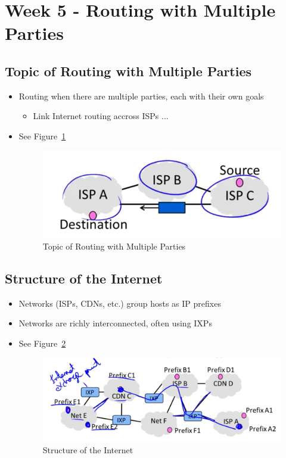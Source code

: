 \documentclass[12pt]{ctexart}   %
\begin{document}
\section{Week 5 - Routing with Multiple Parties}
	\subsection{Topic of Routing with Multiple Parties }
	\begin{itemize}
		\item Routing when there are multiple parties, each with their own goals
		\begin{itemize}
			\item Link Internet routing accross ISPs ...
		\end{itemize}
		\item See Figure~\ref{fig:5-11-1}
			
		\begin{figure}[h!] %
		\centering
		 \includegraphics[scale=0.7]{images/5-11-1}
		\caption{ Topic of Routing with Multiple Parties }
		 \label{fig:5-11-1}
		 \end{figure}
	\end{itemize}
	
	\subsection{Structure of the Internet}
	\begin{itemize}
		\item Networks (ISPs, CDNs, etc.) group hosts as IP prefixes
		\item Networks are richly interconnected, often using IXPs
		\item See Figure~\ref{fig:5-11-2}
			
		\begin{figure}[h!] %
		\centering
		 \includegraphics[scale=0.7]{images/5-11-2}
		\caption{ Structure of the Internet }
		 \label{fig:5-11-2}
		 \end{figure}
	\end{itemize}
	
\end{document}
